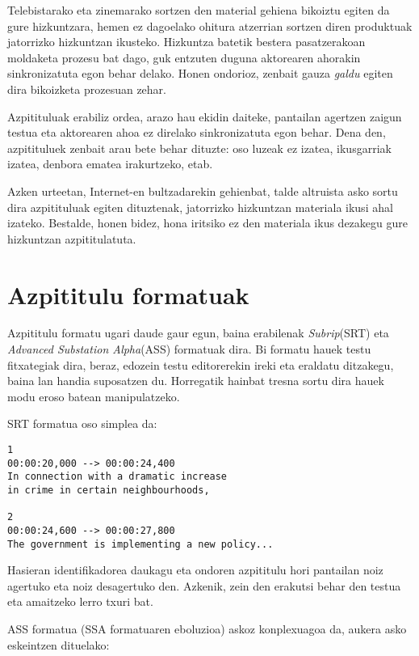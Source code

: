 Telebistarako eta zinemarako sortzen den material gehiena bikoiztu egiten da gure hizkuntzara, hemen ez dagoelako ohitura atzerrian sortzen diren produktuak jatorrizko hizkuntzan ikusteko. Hizkuntza batetik bestera pasatzerakoan moldaketa prozesu bat dago, guk entzuten duguna aktorearen ahorakin sinkronizatuta egon behar delako. Honen ondorioz, zenbait gauza \textit{galdu} egiten dira bikoizketa prozesuan zehar.

Azpitituluak erabiliz ordea, arazo hau ekidin daiteke, pantailan agertzen zaigun testua eta aktorearen ahoa ez direlako sinkronizatuta egon behar. Dena den, azpitituluek zenbait arau bete behar dituzte: oso luzeak ez izatea, ikusgarriak izatea, denbora ematea irakurtzeko, etab.

Azken urteetan, Internet-en bultzadarekin gehienbat, talde altruista asko sortu dira azpitituluak egiten dituztenak, jatorrizko hizkuntzan materiala ikusi ahal izateko. Bestalde, honen bidez, hona iritsiko ez den materiala ikus dezakegu gure hizkuntzan azpititulatuta.

\section{Azpititulu formatuak}
Azpititulu formatu ugari daude gaur egun, baina erabilenak \textit{Subrip}(SRT) eta \textit{Advanced Substation Alpha}(ASS) formatuak dira. Bi formatu hauek testu fitxategiak dira, beraz, edozein testu editorerekin ireki eta eraldatu ditzakegu, baina lan handia suposatzen du. Horregatik hainbat tresna sortu dira hauek modu eroso batean manipulatzeko.

SRT formatua oso simplea da:
\begin{verbatim}
1
00:00:20,000 --> 00:00:24,400
In connection with a dramatic increase
in crime in certain neighbourhoods,

2
00:00:24,600 --> 00:00:27,800
The government is implementing a new policy...
\end{verbatim}

Hasieran identifikadorea daukagu eta ondoren azpititulu hori pantailan noiz agertuko eta noiz desagertuko den. Azkenik, zein den erakutsi behar den testua eta amaitzeko lerro txuri bat.

ASS formatua (SSA formatuaren eboluzioa) askoz konplexuagoa da, aukera asko eskeintzen dituelako:

